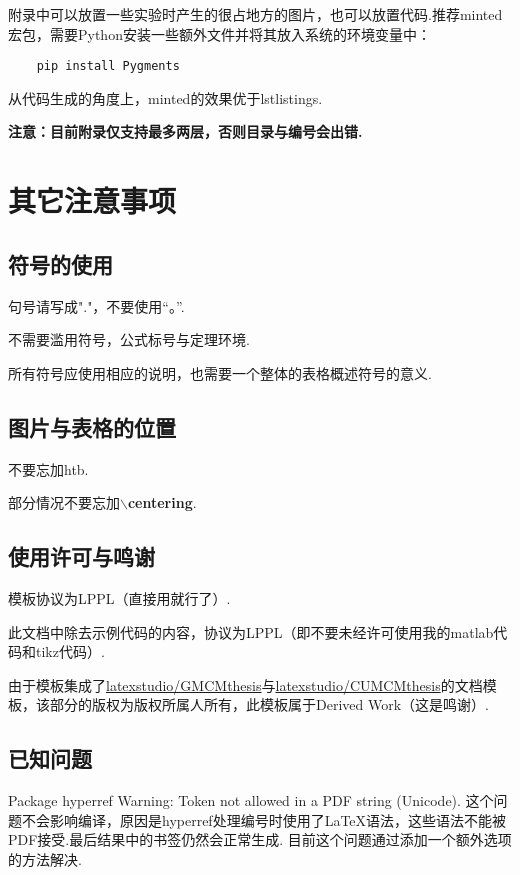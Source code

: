 \documentclass[bwprint, withouttitlepage, openfonts]{mathexpthesis}
\begin{document}
附录中可以放置一些实验时产生的很占地方的图片，也可以放置代码.推荐minted宏包，需要Python安装一些额外文件并将其放入系统的环境变量中：
\begin{verbatim}
    pip install Pygments
\end{verbatim}

从代码生成的角度上，minted的效果优于lstlistings.

\textbf{注意：目前附录仅支持最多两层，否则目录与编号会出错.}

\section{其它注意事项}
\subsection{符号的使用}
句号请写成"."，不要使用“。”.

不需要滥用符号，公式标号与定理环境.

所有符号应使用相应的说明，也需要一个整体的表格概述符号的意义.

\subsection{图片与表格的位置}
不要忘加htb.

部分情况不要忘加$\backslash$\textbf{centering}.

\subsection{使用许可与鸣谢}
模板协议为LPPL（直接用就行了）.

此文档中除去示例代码的内容，协议为LPPL（即不要未经许可使用我的matlab代码和tikz代码）.

由于模板集成了\href{https://github.com/latexstudio/GMCMthesis}{latexstudio/GMCMthesis}与\href{https://github.com/latexstudio/CUMCMthesis}{latexstudio/CUMCMthesis}的文档模板，该部分的版权为版权所属人所有，此模板属于Derived Work（这是鸣谢）.

\subsection{已知问题}
Package hyperref Warning: Token not allowed in a PDF string (Unicode). 这个问题不会影响编译，原因是hyperref处理编号时使用了\LaTeX 语法，这些语法不能被PDF接受.最后结果中的书签仍然会正常生成. 目前这个问题通过添加一个额外选项的方法解决.
\end{document}
